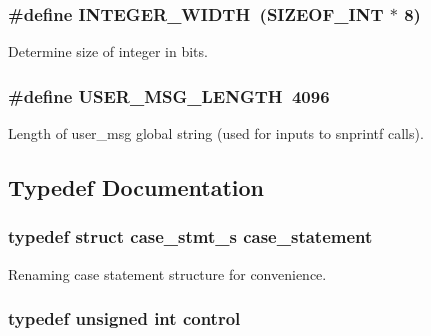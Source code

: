 \subsubsection{\setlength{\rightskip}{0pt plus 5cm}\#define INTEGER\_\-WIDTH\ (SIZEOF\_\-INT $\ast$ 8)}\label{defines_8h_a3}


Determine size of integer in bits. 
\subsubsection{\setlength{\rightskip}{0pt plus 5cm}\#define USER\_\-MSG\_\-LENGTH\ 4096}\label{defines_8h_a4}


Length of user\_\-msg global string (used for inputs to snprintf calls). 

\subsection{Typedef Documentation}
\subsubsection{\setlength{\rightskip}{0pt plus 5cm}typedef struct {\bf case\_\-stmt\_\-s} {\bf case\_\-statement}}\label{defines_8h_a176}


Renaming case statement structure for convenience. 
\subsubsection{\setlength{\rightskip}{0pt plus 5cm}typedef unsigned int {\bf control}}\label{defines_8h_a155}


